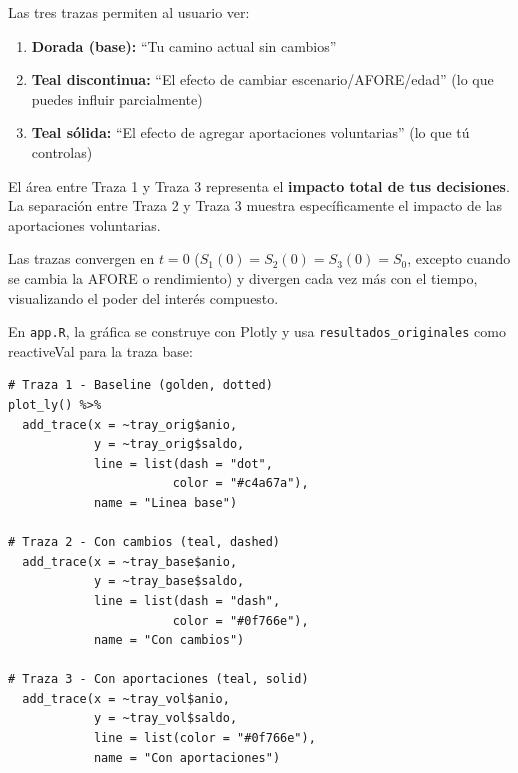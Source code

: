 \documentclass[11pt,a4paper]{report}
\theoremstyle{remark}
\begin{document}
\begin{tcolorbox}[colback=green!5!white, colframe=green!50!black, title=\textbf{Intuici\'on}]
Las tres trazas permiten al usuario ver:
\begin{enumerate}
  \item \textbf{Dorada (base):} ``Tu camino actual sin cambios''
  \item \textbf{Teal discontinua:} ``El efecto de cambiar escenario/AFORE/edad'' (lo que puedes influir parcialmente)
  \item \textbf{Teal s\'olida:} ``El efecto de agregar aportaciones voluntarias'' (lo que t\'u controlas)
\end{enumerate}

El \'area entre Traza 1 y Traza 3 representa el \textbf{impacto total de tus decisiones}. La separaci\'on entre Traza 2 y Traza 3 muestra espec\'ificamente el impacto de las aportaciones voluntarias.

Las trazas convergen en $t = 0$ ($S_1(0) = S_2(0) = S_3(0) = S_0$, excepto cuando se cambia la AFORE o rendimiento) y divergen cada vez m\'as con el tiempo, visualizando el poder del inter\'es compuesto.
\end{tcolorbox}

\begin{tcolorbox}[colback=orange!5!white, colframe=orange!75!black, title=\textbf{Aplicaci\'on en C\'odigo}]
En \texttt{app.R}, la gr\'afica se construye con Plotly y usa \texttt{resultados\_originales} como reactiveVal para la traza base:
\begin{lstlisting}
# Traza 1 - Baseline (golden, dotted)
plot_ly() %>%
  add_trace(x = ~tray_orig$anio,
            y = ~tray_orig$saldo,
            line = list(dash = "dot",
                       color = "#c4a67a"),
            name = "Linea base")

# Traza 2 - Con cambios (teal, dashed)
  add_trace(x = ~tray_base$anio,
            y = ~tray_base$saldo,
            line = list(dash = "dash",
                       color = "#0f766e"),
            name = "Con cambios")

# Traza 3 - Con aportaciones (teal, solid)
  add_trace(x = ~tray_vol$anio,
            y = ~tray_vol$saldo,
            line = list(color = "#0f766e"),
            name = "Con aportaciones")
\end{lstlisting}
\end{tcolorbox}


\end{document}
